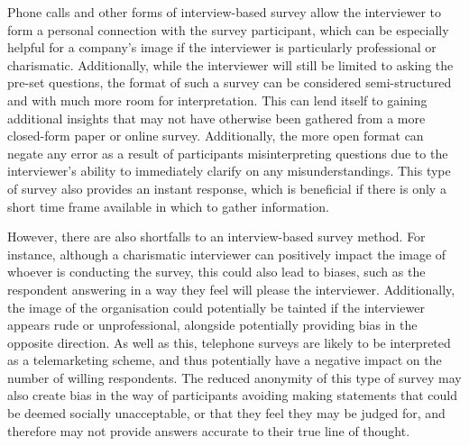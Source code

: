 \documentclass[
  12pt,
  twocolumn]{book}
\begin{document}
Phone calls and other forms of interview-based survey allow the
interviewer to form a personal connection with the survey participant,
which can be especially helpful for a company's image if the interviewer
is particularly professional or charismatic. Additionally, while the
interviewer will still be limited to asking the pre-set questions, the
format of such a survey can be considered semi-structured and with much
more room for interpretation. This can lend itself to gaining additional
insights that may not have otherwise been gathered from a more
closed-form paper or online survey. Additionally, the more open format
can negate any error as a result of participants misinterpreting
questions due to the interviewer's ability to immediately clarify on any
misunderstandings. This type of survey also provides an instant
response, which is beneficial if there is only a short time frame
available in which to gather information.

However, there are also shortfalls to an interview-based survey method.
For instance, although a charismatic interviewer can positively impact
the image of whoever is conducting the survey, this could also lead to
biases, such as the respondent answering in a way they feel will please
the interviewer. Additionally, the image of the organisation could
potentially be tainted if the interviewer appears rude or
unprofessional, alongside potentially providing bias in the opposite
direction. As well as this, telephone surveys are likely to be
interpreted as a telemarketing scheme, and thus potentially have a
negative impact on the number of willing respondents. The reduced
anonymity of this type of survey may also create bias in the way of
participants avoiding making statements that could be deemed socially
unacceptable, or that they feel they may be judged for, and therefore
may not provide answers accurate to their true line of thought.
\end{document}
